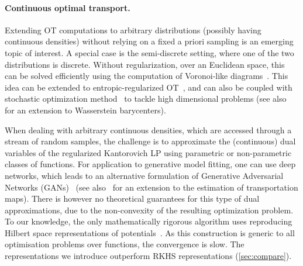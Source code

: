 \paragraph{Continuous optimal transport.} Extending OT computations to arbitrary
distributions (possibly having continuous densities) without relying on a fixed
a priori sampling is an emerging topic of interest. A special case is the
semi-discrete setting, where one of the two distributions is discrete. Without
regularization, over an Euclidean space, this can be solved efficiently using
the computation of Voronoi-like diagrams~\citep{merigot2011multiscale}. This
idea can be extended to entropic-regularized OT~\citep{cuturi2018semidual}, and
can also be coupled with stochastic optimization
method~\citep{2016-genevay-nips} to tackle high dimensional problems (see
also~\citet{staib2017parallel} for an extension to Wasserstein barycenters). 

When dealing with arbitrary continuous densities, which are accessed through a
stream of random samples, the challenge is to approximate  the (continuous) dual
variables of the regularized Kantorovich LP using parametric or non-parametric
classes of functions. For application to generative model fitting, one can use
deep networks, which leads to an alternative formulation of Generative
Adversarial Networks (GANs)~\citep{arjovsky2017wgan} (see
also~\citet{seguy2018large} for an extension to the estimation of transportation
maps). There is however no theoretical guarantees for this type of dual
approximations, due to the non-convexity of the resulting optimization problem.
To our knowledge, the only mathematically rigorous algorithm uses reproducing
Hilbert space representations of potentials~\citep{2016-genevay-nips}. As this
construction is generic to all optimisation problems over functions, the convergence is slow. The representations we introduce outperform RKHS representations (\autoref{sec:compare}).